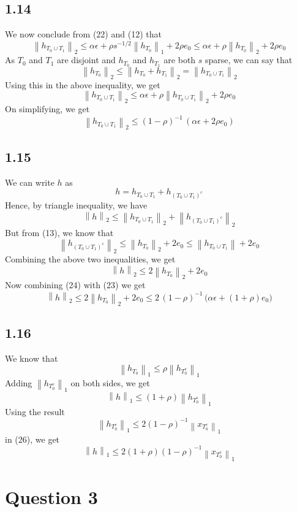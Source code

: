 \documentclass[12pt]{article}
\newcommand{\norm}[1]{\left\lVert #1 \right\rVert}
\begin{document}
\subsection*{1.14}
We now conclude from (22) and (12) that 
$$\norm{h_{T_0 \cup T_1}}_2 \leq \alpha \epsilon + \rho s^{-1/2}\norm{h_{T_0}}_1 + 2\rho e_0 \leq \alpha \epsilon + \rho \norm{h_{T_0}}_2 + 2\rho e_0$$
As $T_0$ and $T_1$ are disjoint and $h_{T_0}$ and $h_{T_1}$ are both $s$ sparse, we can say that 
$$\norm{h_{T_0}}_2 \leq \norm{h_{T_0} + h_{T_1}}_2 = \norm{h_{T_0 \cup T_1}}_2$$
Using this in the above inequality, we get
$$\norm{h_{T_0 \cup T_1}}_2 \leq \alpha \epsilon + \rho \norm{h_{T_0 \cup T_1}}_2 + 2 \rho e_0$$
On simplifying, we get
\begin{equation}
\norm{h_{T_0 \cup T_1}}_2 \leq (1 - \rho)^{-1} \, (\alpha \epsilon + 2\rho e_0)
\end{equation}
\subsection*{1.15}
We can write $h$ as
$$h = h_{T_0 \cup T_1} + h_{(T_0 \cup T_1)^c}$$
Hence, by triangle inequality, we have
$$\norm{h}_2 \leq \norm{h_{T_0 \cup T_1}}_2 + \norm{h_{(T_0 \cup T_1)^c}}_2$$
But from (13), we know that
$$\norm{h_{(T_0 \cup T_1)^c}}_2 \leq \norm{h_{T_0}}_2 + 2e_0 \leq \norm{h_{T_0 \cup T_1}} + 2e_0$$
Combining the above two inequalities, we get
\begin{equation}
\norm{h}_2 \leq 2 \norm{h_{T_0}}_2 + 2e_0
\end{equation}
Now combining (24) with (23) we get
\begin{equation}
\norm{h}_2 \leq 2 \norm{h_{T_0}}_2 + 2e_0 \leq 2\,(1 - \rho)^{-1}\,\big(\alpha \epsilon + (1 + \rho)e_0\big)
\end{equation}
\subsection*{1.16}
We know that
$$\norm{h_{T_0}}_1 \leq \rho \norm{h_{T_0^c}}_1$$
Adding $\norm{h_{T_0^c}}_1$ on both sides, we get
\begin{equation}
\norm{h}_1 \leq (1 + \rho) \norm{h_{T_0^c}}_1
\end{equation}
Using the result 
$$\norm{h_{T_0^c}}_1 \leq 2(1 - \rho)^{-1} \norm{x_{T_0^c}}_1$$
in (26), we get
\begin{equation}
\norm{h}_1 \leq 2(1+\rho)(1-\rho)^{-1} \norm{x_{T_0^c}}_1
\end{equation}
\newpage
\section*{Question 3}
\end{document}

